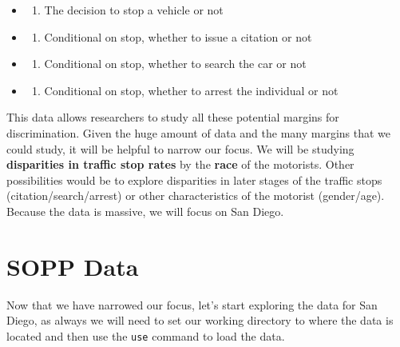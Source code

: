 \documentclass[
]{book}
\providecommand{\tightlist}{%
  \setlength{\itemsep}{0pt}\setlength{\parskip}{0pt}}
\begin{document}
\begin{itemize}
\tightlist
\item
  \begin{enumerate}
  \def\labelenumi{\arabic{enumi}.}
  \tightlist
  \item
    The decision to stop a vehicle or not
  \end{enumerate}
\item
  \begin{enumerate}
  \def\labelenumi{\arabic{enumi}.}
  \setcounter{enumi}{1}
  \tightlist
  \item
    Conditional on stop, whether to issue a citation or not
  \end{enumerate}
\item
  \begin{enumerate}
  \def\labelenumi{\arabic{enumi}.}
  \setcounter{enumi}{2}
  \tightlist
  \item
    Conditional on stop, whether to search the car or not
  \end{enumerate}
\item
  \begin{enumerate}
  \def\labelenumi{\arabic{enumi}.}
  \setcounter{enumi}{3}
  \tightlist
  \item
    Conditional on stop, whether to arrest the individual or not
  \end{enumerate}
\end{itemize}

This data allows researchers to study all these potential margins for discrimination. Given the huge amount of data and the many margins that we could study, it will be helpful to narrow our focus. We will be studying \textbf{disparities in traffic stop rates} by the \textbf{race} of the motorists. Other possibilities would be to explore disparities in later stages of the traffic stops (citation/search/arrest) or other characteristics of the motorist (gender/age). Because the data is massive, we will focus on San Diego.

\section{SOPP Data}\label{sopp-data}

Now that we have narrowed our focus, let's start exploring the data for San Diego, as always we will need to set our working directory to where the data is located and then use the \texttt{use} command to load the data.
\end{document}
